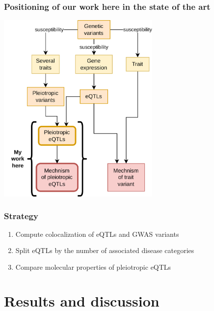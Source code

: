\documentclass{beamer}
\newcounter{frame}[frame]
\begin{document}
    \begin{frame}
        \frametitle{Positioning of our work here in the state of the art}

        \begin{center}
            \includegraphics[width=0.6\textwidth]{fig/graphical_intro_approach.v2.drawio.png}
        \end{center}

    \end{frame}

    \begin{frame}
        \frametitle{Strategy}

        \begin{enumerate}
            \item Compute colocalization of eQTLs and GWAS variants
            \item Split eQTLs by the number of associated disease categories
            \item Compare molecular properties of pleiotropic eQTLs
        \end{enumerate}

    \end{frame}


    \section{Results and discussion} %
\end{document}
